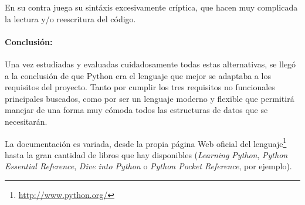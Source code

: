 En su contra juega su sintáxis excesivamente críptica, que hacen muy complicada
la lectura y/o reescritura del código.

\newpage

\paragraph{Conclusión:}Una vez estudiadas y evaluadas cuidadosamente todas estas 
alternativas, se llegó a la conclusión de que Python era el lenguaje que mejor se 
adaptaba a los requisitos del proyecto. Tanto por cumplir los tres requisitos 
no funcionales principales buscados, como por ser un lenguaje moderno y flexible 
que permitirá manejar de una forma muy cómoda todos las estructuras de datos que se
necesitarán.

La documentación es variada, desde la propia página Web oficial del 
lenguaje\footnote{\url{http://www.python.org/}} hasta la gran cantidad de libros
que hay disponibles (\emph{Learning Python}\cite{LearningPython},
\emph{Python Essential Reference}\cite{PythonEssential}, 
\emph{Dive into Python}\cite{DivePython} o \emph{Python Pocket Reference}\cite{PythonPocket},
por ejemplo).
